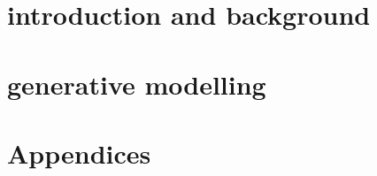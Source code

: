 \documentclass[\classfontsize,\papersize,twoside,showtrims,extrafontsizes]{memoir}  %
\begin{document}
\prefrontmatter

\cleartoevenpage

\cleartooddpage

\cleartoevenpage

\frontmatter







\clearforchapter
\printglossary[title=Abbreviations, toctitle=abbrevations, type=\acronymtype]

\clearforchapter
\printnomenclature
{}

\clearforchapter
\listoffigures*
{}

\clearforchapter
\listoftables*
{}

\clearforchapter
\tableofcontents*

\clearforchapter
\mylistoftodos

\mainmatter

\part[introduction and background]{introduction and background}




\part[generative modelling]{generative modelling}




% 
% 

\part[Appendices]{Appendices}
\appendix


% 

\backmatter
\printbibliography
\end{document}
